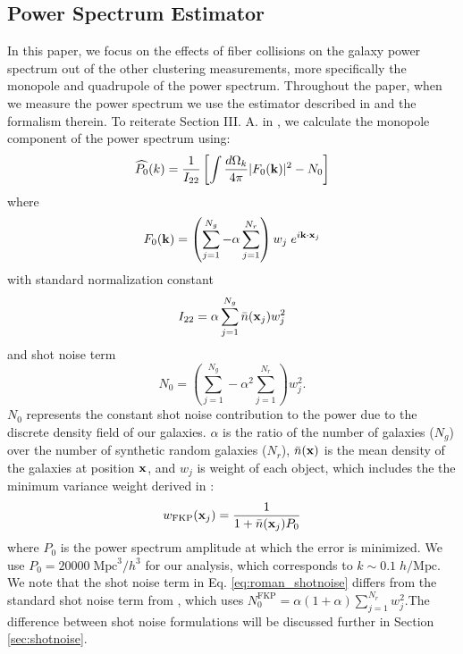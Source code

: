 \documentclass{emulateapj}
\begin{document}
\subsection{Power Spectrum Estimator} \label{sec:pk_est}

In this paper, we focus on the effects of fiber collisions on the galaxy power spectrum out of the other clustering measurements, more specifically the monopole and quadrupole of the power spectrum. Throughout the paper, when we measure the power spectrum we use the estimator described in \cite{Scoccimarro:2015aa} and the formalism therein. To reiterate Section III. A. in \cite{Scoccimarro:2015aa}, we calculate the monopole component of the power spectrum using: 
\begin{equation}\label{eq:roman_p0k}
\widehat{P_0}(k) = \frac{1}{I_{22}} \left[ \int \frac{d\Omega_k}{4 \pi} |F_0({\bf k})|^2 - N_0 \right]
\end{equation}
where 
\begin{equation}
F_0({\bf k}) = \left( \sum_{j = 1}^{N_g} - \alpha \sum_{j=1}^{N_r} \right) w_j\;e^{i {\bf k}\cdot{\bf x}_j}
\end{equation}
with standard normalization constant
\begin{equation} \label{eq:i22}
I_{22} = \alpha \sum^{N_g}_{j=1} \bar{n}({\bf x}_j)w_j^2
\end{equation}
and shot noise term
\begin{equation} \label{eq:roman_shotnoise}
N_0 = \left( \sum_{j = 1}^{N_g} - \alpha^2 \sum_{j=1}^{N_r} \right) w_j^2. 
\end{equation}
$N_0$ represents the constant shot noise contribution to the power due to the discrete density field of our galaxies. $\alpha$ is the ratio of the number of galaxies ($N_g$) over the number of synthetic random galaxies ($N_r$), $\bar{n}({\bf x})$ is the mean density of the galaxies at position ${\bf x}$, and $w_j$ is weight of each object, which includes the the minimum variance weight derived in \cite{Feldman:1994aa}: 
\begin{equation}
w_{\mathrm{FKP}} ({\bf x}_j) = \frac{1}{1+\bar{n}({\bf x}_j) P_0}
\end{equation}
where $P_0$ is the power spectrum amplitude at which the error is minimized. We use $P_0 = 20000\; \mathrm{Mpc}^3/h^3$ for our analysis, which corresponds to $k \sim 0.1\; h/\mathrm{Mpc}$. We note that the shot noise term in Eq. \ref{eq:roman_shotnoise} differs from the standard shot noise term from \cite{Feldman:1994aa}, which uses $N_0^\mathrm{FKP} = \alpha (1+\alpha) \sum^{N_r}_{j=1} w_j^2. $The difference between shot noise formulations will be discussed further in Section \ref{sec:shotnoise}. 
\end{document}
